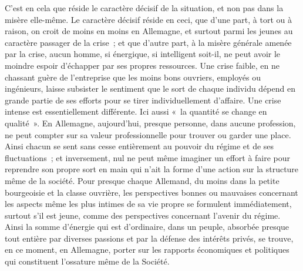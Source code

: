 \documentclass[french,twoside]{book} %
\begin{document}
C'est en cela que réside le caractère décisif de la situation, et non pas dans la misère elle-même. Le caractère décisif réside en ceci, que d'une part, à tort ou à raison, on croit de moins en moins en Allemagne, et surtout parmi les jeunes au caractère passager de la crise ; et que d'autre part, à la misère générale amenée par la crise, aucun homme, si énergique, si intelligent soit-il, ne peut avoir le moindre espoir d'échapper par ses propres ressources. Une crise faible, en ne chassant guère de l'entreprise que les moins bons ouvriers, employés ou ingénieurs, laisse subsister le sentiment que le sort de chaque individu dépend en grande partie de ses efforts pour se tirer individuellement d'affaire. Une crise intense est essentiellement différente. Ici aussi « la quan­tité se change en qualité ». En Allemagne, aujourd'hui, presque personne, dans aucune profession, ne peut compter sur sa valeur professionnelle pour trouver ou garder une place. Ainsi chacun se sent sans cesse entièrement au pouvoir du régime et de ses fluctuations ; et inversement, nul ne peut même imaginer un effort à faire pour reprendre son propre sort en main qui n'ait la forme d'une action sur la structure même de la société. Pour presque chaque Allemand, du moins dans la petite bourgeoisie et la classe ouvrière, les pers­pectives bonnes ou mauvaises concernant les aspects même les plus intimes de sa vie propre se formulent immédiatement, surtout s'il est jeune, comme des perspectives concernant l'avenir du régime. Ainsi la somme d'énergie qui est d'ordinaire, dans un peuple, absorbée presque tout entière par diverses passions et par la défense des intérêts privés, se trouve, en ce moment, en Allemagne, porter sur les rapports économiques et politiques qui constituent l'ossature même de la Société.\par
\end{document}
